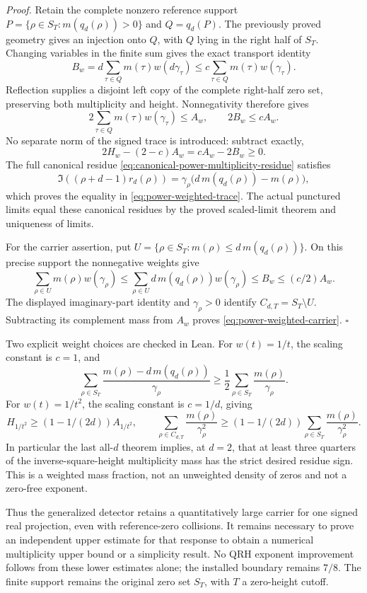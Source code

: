 \emph{Proof.}
Retain the complete nonzero reference support
\(P=\{\rho\in S_T:m(q_d(\rho))>0\}\) and \(Q=q_d(P)\).
The previously proved geometry gives an injection onto \(Q\), with
\(Q\) lying in the right half of \(S_T\). Changing variables in the
finite sum gives the exact transport identity
\[
 B_w=d\sum_{\tau\in Q}m(\tau)w(d\gamma_\tau)
       \le c\sum_{\tau\in Q}m(\tau)w(\gamma_\tau).
\]
Reflection supplies a disjoint left copy of the complete right-half
zero set, preserving both multiplicity and height. Nonnegativity
therefore gives
\[
 2\sum_{\tau\in Q}m(\tau)w(\gamma_\tau)\le A_w,\qquad
 2B_w\le cA_w.
\]
No separate norm of the signed trace is introduced: subtract exactly,
\[
 2H_w-(2-c)A_w=cA_w-2B_w\ge0.
\]
The full canonical residue
\eqref{eq:canonical-power-multiplicity-residue} satisfies
\[
 \Im((\rho+d-1)r_d(\rho))
   =\gamma_\rho\bigl(d\,m(q_d(\rho))-m(\rho)\bigr),
\]
which proves the equality in \eqref{eq:power-weighted-trace}.
The actual punctured limits equal these canonical residues by the
proved scaled-limit theorem and uniqueness of limits.

For the carrier assertion, put
\(U=\{\rho\in S_T:m(\rho)\le d\,m(q_d(\rho))\}\).
On this precise support the nonnegative weights give
\[
 \sum_{\rho\in U}m(\rho)w(\gamma_\rho)
 \le\sum_{\rho\in U}d\,m(q_d(\rho))w(\gamma_\rho)
 \le B_w\le(c/2)A_w.
\]
The displayed imaginary-part identity and \(\gamma_\rho>0\) identify
\(C_{d,T}=S_T\setminus U\). Subtracting its complement mass from
\(A_w\) proves \eqref{eq:power-weighted-carrier}. \(\square\)

Two explicit weight choices are checked in Lean. For \(w(t)=1/t\),
the scaling constant is \(c=1\), and
\begin{equation}\label{eq:inverse-height-signed-trace}
 \sum_{\rho\in S_T}
       \frac{m(\rho)-d\,m(q_d(\rho))}{\gamma_\rho}
 \ge\frac12\sum_{\rho\in S_T}\frac{m(\rho)}{\gamma_\rho}.
\end{equation}
For \(w(t)=1/t^2\), the scaling constant is \(c=1/d\), giving
\[
 H_{1/t^2}\ge(1-1/(2d))A_{1/t^2},\qquad
 \sum_{\rho\in C_{d,T}}\frac{m(\rho)}{\gamma_\rho^2}
 \ge(1-1/(2d))\sum_{\rho\in S_T}\frac{m(\rho)}{\gamma_\rho^2}.
\]
In particular the last all-\(d\) theorem implies, at \(d=2\), that at
least three quarters of the inverse-square-height multiplicity mass
has the strict desired residue sign. This is a weighted mass fraction,
not an unweighted density of zeros and not a zero-free exponent.

Thus the generalized detector retains a quantitatively large carrier
for one signed real projection, even with reference-zero collisions.
It remains necessary to prove an independent upper estimate for that
response to obtain a numerical multiplicity upper bound or a simplicity
result. No QRH exponent improvement follows from these lower estimates
alone; the installed boundary remains \(7/8\). The finite support remains
the original zero set \(S_T\), with \(T\) a zero-height cutoff.

